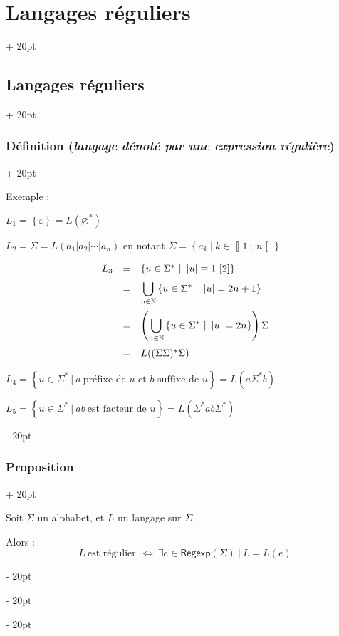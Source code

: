 \documentclass[a4paper, 12pt, twoside]{article}
\newcommand{\N}{\mathbb{N}} %
\newcommand{\nset}[2]{\left\llbracket #1\ ;\ #2 \right\rrbracket}
\newcommand{\lr}[1]{\left( #1 \right)}
\newcommand{\set}[1]{\left\{ #1 \right\}}
\newcommand{\abs}[1]{\left\lvert #1 \right\rvert}
\newcommand{\ssi}{\ \Leftrightarrow \ }
\newcommand{\ind}[1][20pt]{\advance\leftskip + #1}
\newcommand{\deind}[1][20pt]{\advance\leftskip - #1}
\newenvironment{indt}[2][20pt]{#2 \par \ind[#1]}{\par \deind} %
\newcommand{\Regexp}{\mathsf{Regexp}}
\begin{document}
\begin{indt}{\section{Langages réguliers}}
\begin{indt}{\subsection{Langages réguliers}}
\begin{indt}{\subsubsection{Définition (\textit{langage dénoté par une expression régulière})}}
                \vspace{6pt}
                
                Exemple :

                $L_1 = \set \varepsilon = L(\varnothing^*)$

                $L_2 = \Sigma = L(a_1 | a_2 | \cdots | a_n)$ en notant $\Sigma = \set{a_k\ |\ k \in \nset 1 n}$

                \[
                    \begin{array}{rcl}
                        L_3 &=& \set{u \in \Sigma^*\ |\ \abs u \equiv 1\ [2]}
                            \vspace{6pt}
                        \\
                            &=& \displaystyle \bigcup_{n \in \N} \set{u \in \Sigma^*\ |\ \abs u = 2n + 1}
                            \vspace{6pt}
                        \\
                            &=& \displaystyle \lr{\bigcup_{n \in \N} \set{u \in \Sigma^*\ |\ \abs u = 2n}}\Sigma
                            \vspace{6pt}
                        \\
                            &=& L\!\lr{(\Sigma\Sigma)^* \Sigma}
                    \end{array}
                \]

                $L_4 = \set{u \in \Sigma^*\ |\ a\ \text{préfixe de $u$ et $b$ suffixe de $u$}} = L(a\Sigma^* b)$

                $L_5 = \set{u \in \Sigma^*\ |\ ab\ \text{est facteur de $u$}} = L(\Sigma^* ab \Sigma^*)$
            \end{indt}

            \vspace{12pt}
            
            \begin{indt}{\subsubsection{Proposition}}
                \begin{emphBox}
                    Soit $\Sigma$ un alphabet, et $L$ un langage sur $\Sigma$.

                    Alors :
                    \[
                        L\ \text{est régulier}\ \ssi \exists e \in \Regexp(\Sigma)\ |\ L = L(e)
                    \]
                \end{emphBox}


\end{indt}
\end{indt}
\end{indt}
\end{document}
